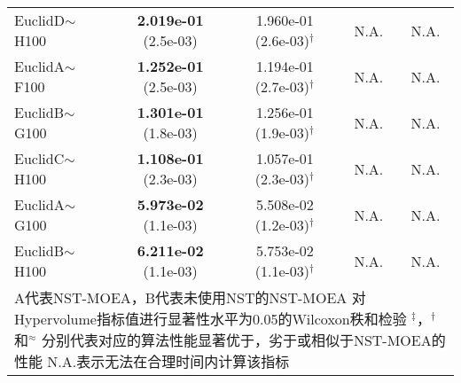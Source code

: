 {\begin{longtable}[c]{lcc|cc}
    EuclidD$\sim$H100   &\textbf{2.019e-01} (2.5e-03)	&1.960e-01 (2.6e-03)$^{\dag}$      &N.A.            &N.A. \\	
    EuclidA$\sim$F100   &\textbf{1.252e-01} (2.5e-03)	&1.194e-01 (2.7e-03)$^{\dag}$      &N.A.            &N.A. \\
    EuclidB$\sim$G100   &\textbf{1.301e-01} (1.8e-03)	&1.256e-01 (1.9e-03)$^{\dag}$      &N.A.            &N.A. \\	
    EuclidC$\sim$H100   &\textbf{1.108e-01} (2.3e-03)	&1.057e-01 (2.3e-03)$^{\dag}$      &N.A.            &N.A. \\
    EuclidA$\sim$G100   &\textbf{5.973e-02} (1.1e-03)	&5.508e-02 (1.2e-03)$^{\dag}$      &N.A.            &N.A. \\	
    EuclidB$\sim$H100   &\textbf{6.211e-02} (1.1e-03)	&5.753e-02 (1.1e-03)$^{\dag}$      &N.A.            &N.A. \\	
    \bottomrule
    \multicolumn{5}{p{35em}}{
        A代表NST-MOEA，B代表未使用NST的NST-MOEA\vspace{-.75em}\newline{}
        对Hypervolume指标值进行显著性水平为0.05的Wilcoxon秩和检验\vspace{-.75em}\newline{}
        $^\ddag$，$^\dag$和$^\approx$ 分别代表对应的算法性能显著优于，劣于或相似于NST-MOEA的性能\vspace{-.75em}\newline{}
        N.A.表示无法在合理时间内计算该指标
        }
\end{longtable}
}%
